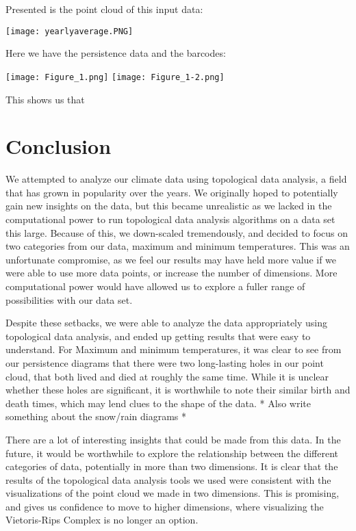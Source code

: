 \documentclass[12pt]{report}
\begin{document}
Presented is the point cloud of this input data:
\begin{center}
\texttt{[image: yearlyaverage.PNG]}
\end{center}


\clearpage
Here we have the persistence data and the barcodes:\par
\begin{center}
\texttt{[image: Figure\_1.png]}
\texttt{[image: Figure\_1-2.png]}
\end{center}
This shows us that


\clearpage
\section*{Conclusion}
We attempted to analyze our climate data using topological data analysis, a field that has grown in popularity over the years. We originally hoped to potentially gain new insights on the data, but this became unrealistic as we lacked in the computational power to run topological data analysis algorithms on a data set this large. Because of this, we down-scaled tremendously, and decided to focus on two categories from our data, maximum and minimum temperatures. This was an unfortunate compromise, as we feel our results may have held more value if we were able to use more data points, or increase the number of dimensions. More computational power would have allowed us to explore a fuller range of possibilities with our data set.\par
Despite these setbacks, we were able to analyze the data appropriately using topological data analysis, and ended up getting results that were easy to understand. For Maximum and minimum temperatures, it was clear to see from our persistence diagrams that there were two long-lasting holes in our point cloud, that both lived and died at roughly the same time. While it is unclear whether these holes are significant, it is worthwhile to note their similar birth and death times, which may lend clues to the shape of the data. * Also write something about the snow/rain diagrams *\par
There are a lot of interesting insights that could be made from this data. In the future, it would be worthwhile to explore the relationship between the different categories of data, potentially in more than two dimensions. It is clear that the results of the topological data analysis tools we used were consistent with the visualizations of the point cloud we made in two dimensions. This is promising, and gives us confidence to move to higher dimensions, where visualizing the Vietoris-Rips Complex is no longer an option.\par
\end{document}
